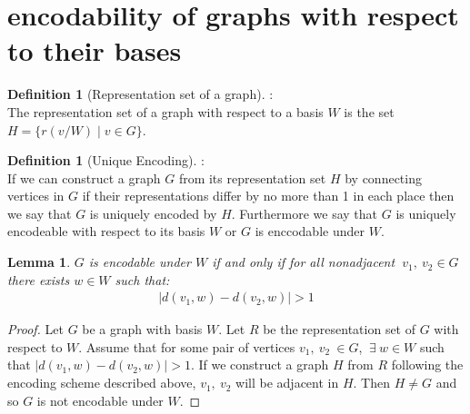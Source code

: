 \documentclass[11pt]{amsart}
\theoremstyle{plain}  %
\newtheorem{lem}[thm]{Lemma}
\theoremstyle{definition}
\newtheorem{defin}[thm]{{Definition}}
\theoremstyle{remark}
\numberwithin{equation}{thm}
\begin{document}
\section{encodability of graphs with respect to their bases}


  \begin{defin}[Representation set of a graph]:\\
  The representation set of a graph with respect to a basis $W$ is the set $H=\{r(v/W)\mid v\in G\}$.   
  \end{defin}

  \begin{defin}[Unique Encoding]:\\
   If we can construct a graph $G$ from its representation set $H$ by connecting vertices in $G$ 
   if their representations differ by no more than 1 in each place then we say that $G$ is uniquely encoded by $H$.
   Furthermore we say that $G$ is uniquely encodeable with respect to its basis $W$ or $G$ is enccodable under $W$.
  \end{defin}

\begin{lem}
$G$ is encodable under $W$ if and only if for all nonadjacent $\ v_1,\ v_2\in G$ there exists $w \in W$ such that:
\begin{align*}
| d(v_1,w)-d(v_2,w)| > 1 
\end{align*}
\end{lem}
\begin{proof}
Let $G$ be a graph with basis $W$. Let $R$ be the representation set of $G$ with respect to $W$. 
Assume that for some pair of vertices $v_1,\ v_2\ \in G$, $\ \exists\ w \in W$ such that $\left| d(v_1,w)-d(v_2,w)\right| > 1$.
If we construct a graph $H$ from $R$ following the encoding scheme described above, $v_1,\ v_2$ will be adjacent in $H$. 
Then $H \neq G$ and so $G$ is not encodable under $W$.
\end{proof}
\end{document}
